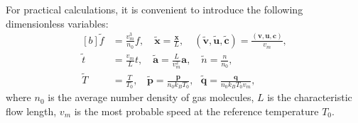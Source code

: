 
For practical calculations, it is convenient to introduce the following dimensionless variables:
\begin{equation}\label{normalization}
\begin{aligned}[b]
    \widetilde{f}&=\frac{v_m^3}{n_0}f, \quad
     \widetilde{\bm{x}}=\frac{\bm{x}}{L}, \quad (\widetilde{\bm{v}},\widetilde{\bm{u}},\widetilde{\bm{c}})=\frac{(\bm{v},\bm{u},\bm{c})}{v_m}, \\
\widetilde{t}&=\frac{v_m}{L}t, \quad
\widetilde{\bm{a}}=\frac{L}{v_m^2}\bm{a}, \quad
\widetilde{n}=\frac{n}{n_0}, \\
 \widetilde{T}&=\frac{T}{T_0}, \ \ \ \
\widetilde{\bm{p}}=\frac{\bm{p}}{n_0k_BT_0}, \ \ \
\widetilde{\bm{q}}=\frac{\bm{q}}{n_0k_BT_0v_m},
\end{aligned}
\end{equation}
where $n_0$ is the average number density of gas molecules, $L$ is the characteristic flow length, $v_m$ is the most probable speed at the reference temperature $T_0$. 





